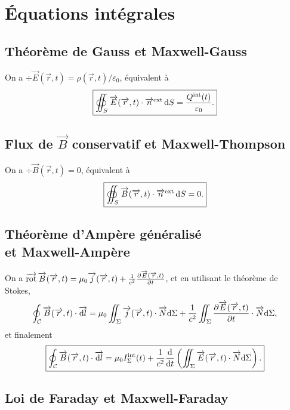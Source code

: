 \section{Équations intégrales}
\subsection{Théorème de Gauss et Maxwell-Gauss}

On a $\div\vec{E}(\vec{r},t)=\rho(\vec{r},t)/\varepsilon_0$, équivalent à 
\begin{equation}
    \boxed{
        \oiint_{S}\protect\overrightarrow{{E}}(\protect\overrightarrow{{r}},t)\cdot\protect\overrightarrow{{n}}^{\mathrm{ext}}\,\mathrm{d} S=\frac{Q^{\mathrm{int}}(t)}{\varepsilon_0}.
    }
\end{equation}

\subsection{Flux de \texorpdfstring{$\vec{B}$}{B} conservatif et Maxwell-Thompson}

On a $\div\vec{B}(\vec{r},t)=0$, équivalent à
\begin{equation}
    \boxed{
        \oiint_{S}\protect\overrightarrow{{B}}(\protect\overrightarrow{{r}},t)\cdot\protect\overrightarrow{{n}}^{\mathrm{ext}}\,\mathrm{d} S=0.
    }
\end{equation}

\subsection{Théorème d'Ampère généralisé\texorpdfstring{\\}{ }et Maxwell-Ampère}

On a $\operatorname{\overrightarrow{\text{rot}}}\protect\overrightarrow{{B}}(\protect\overrightarrow{{r}},t)=\mu_0\protect\overrightarrow{{j}}(\protect\overrightarrow{{r}},t)+\frac{1}{c^{2}}\frac{\partial\protect\overrightarrow{{E}}(\protect\overrightarrow{{r}},t)}{\partial t}$, et en utilisant le théorème de Stokes,
\begin{equation}
    \oint_{\mathcal{C}}\protect\overrightarrow{{B}}(\protect\overrightarrow{{r}},t)\cdot\protect\overrightarrow{{\mathrm{d} l}}=\mu_0\iint_{\Sigma}\protect\overrightarrow{{j}}(\protect\overrightarrow{{r}},t)\cdot\protect\overrightarrow{{N}}\mathrm{d}\Sigma+\frac{1}{c^{2}}\iint_{\Sigma}\frac{\partial\protect\overrightarrow{{E}}(\protect\overrightarrow{{r}},t)}{\partial t}\cdot\protect\overrightarrow{{N}}\mathrm{d}\Sigma,
\end{equation}
et finalement
\begin{equation}
    \boxed{
        \oint_{\mathcal{C}}\protect\overrightarrow{{B}}(\protect\overrightarrow{{r}},t)\cdot\protect\overrightarrow{{\mathrm{d} l}}=\mu_{0}I_{\Sigma}^{\mathrm{int}}(t)+\frac{1}{c^{2}}\frac{\mathrm{d}}{\mathrm{d} t}\left(\iint_{\Sigma}\protect\overrightarrow{{E}}(\protect\overrightarrow{{r}},t)\cdot\protect\overrightarrow{{N}}\mathrm{d}\Sigma\right).
    }
\end{equation}

\subsection{Loi de Faraday et Maxwell-Faraday}

